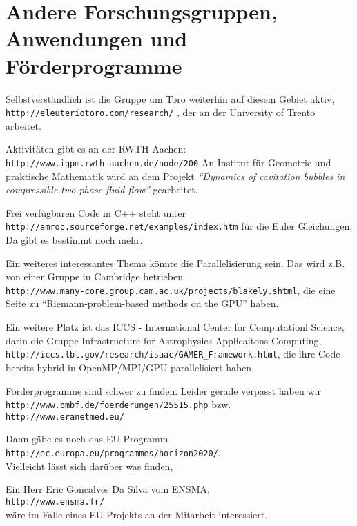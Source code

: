 \section{Andere Forschungsgruppen, Anwendungen und Förderprogramme}

Selbstverständlich ist die Gruppe um Toro weiterhin auf diesem Gebiet
aktiv, \\
\verb+http://eleuteriotoro.com/research/+
, der an der University of Trento arbeitet.





Aktivitäten gibt es an der RWTH Aachen:\\
\verb+http://www.igpm.rwth-aachen.de/node/200+ An Institut für
Geometrie und praktische Mathematik wird an dem Projekt {\it
  ``Dynamics of cavitation bubbles in compressible two-phase fluid
  flow''} gearbeitet.


Frei verfügbaren Code in C++ steht unter\\
\verb+http://amroc.sourceforge.net/examples/index.htm+ für die Euler
Gleichungen. Da gibt es bestimmt noch mehr.

Ein weiteres interessantes Thema könnte die Parallelisierung sein. Das
wird z.B. von einer Gruppe in Cambridge betrieben\\
\verb+http://www.many-core.group.cam.ac.uk/projects/blakely.shtml+, die
eine Seite zu ``Riemann-problem-based methods on the GPU'' haben.

Ein weitere Platz ist das ICCS - International Center for Computationl
Science, darin die Gruppe Infrastructure for Astrophysics Applicaitons
Computing,\\
\verb+http://iccs.lbl.gov/research/isaac/GAMER_Framework.html+, die
ihre Code bereits hybrid in OpenMP/MPI/GPU parallelisiert haben.


Förderprogramme sind schwer zu finden. Leider gerade verpasst haben wir\\
\verb+http://www.bmbf.de/foerderungen/25515.php+ bzw. \\
\verb+http://www.eranetmed.eu/+

Dann gäbe es noch das EU-Programm\\
\verb+http://ec.europa.eu/programmes/horizon2020/+.\\
Vielleicht lässt sich darüber was finden, 

Ein Herr Eric Goncalves Da Silva vom ENSMA,\\
\verb+http://www.ensma.fr/+\\
wäre im Falle eines EU-Projekts an der Mitarbeit interessiert.


